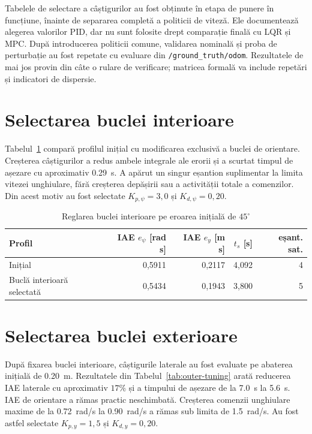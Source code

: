 \documentclass[12pt,a4paper,oneside]{report}
\begin{document}
Tabelele de selectare a câștigurilor au fost obținute în etapa de punere în
funcțiune, înainte de separarea completă a politicii de viteză. Ele documentează
alegerea valorilor PID, dar nu sunt folosite drept comparație finală cu LQR și
MPC. După introducerea politicii comune, validarea nominală și proba de
perturbație au fost repetate cu evaluare din \texttt{/ground\_truth/odom}.
Rezultatele de mai jos provin din câte o rulare de verificare; matricea formală
va include repetări și indicatori de dispersie.

\section{Selectarea buclei interioare}

Tabelul~\ref{tab:inner-tuning} compară profilul inițial cu modificarea exclusivă
a buclei de orientare. Creșterea câștigurilor a redus ambele integrale ale
erorii și a scurtat timpul de așezare cu aproximativ \SI{0.29}{s}. A apărut un
singur eșantion suplimentar la limita vitezei unghiulare, fără creșterea
depășirii sau a activității totale a comenzilor. Din acest motiv au fost selectate
$K_{p,\psi}=3{,}0$ și $K_{d,\psi}=0{,}20$.

\begin{table}[htbp]
  \centering
  \caption{Reglarea buclei interioare pe eroarea inițială de $45^\circ$}
  \label{tab:inner-tuning}
  \begin{tabular}{lrrrr}
    \toprule
    Profil & IAE $e_\psi$ [rad s] & IAE $e_y$ [m s] & $t_s$ [s] & eșant. sat. \\
    \midrule
    Inițial & 0,5911 & 0,2117 & 4,092 & 4 \\
    Buclă interioară selectată & 0,5434 & 0,1943 & 3,800 & 5 \\
    \bottomrule
  \end{tabular}
\end{table}

\section{Selectarea buclei exterioare}

După fixarea buclei interioare, câștigurile laterale au fost evaluate pe
abaterea inițială de \SI{0.20}{m}. Rezultatele din
Tabelul~\ref{tab:outer-tuning} arată reducerea IAE laterale cu aproximativ
$17\%$ și a timpului de așezare de la \SI{7.0}{s} la \SI{5.6}{s}. IAE de
orientare a rămas practic neschimbată. Creșterea comenzii unghiulare maxime de
la \SI{0.72}{rad/s} la \SI{0.90}{rad/s} a rămas sub limita de
\SI{1.5}{rad/s}. Au fost astfel selectate $K_{p,y}=1{,}5$ și
$K_{d,y}=0{,}20$.
\end{document}
